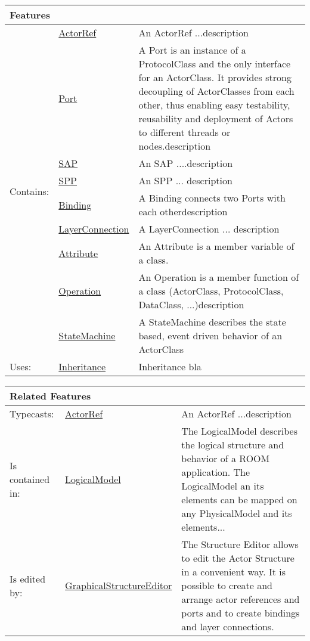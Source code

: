 			
			\begingroup
			\renewcommand{\arraystretch}{1.8} %
			\begin{longtable}{p{2.5cm}|p{4cm} p{}}
				\multicolumn{2}{l}{\textbf{\large Features}} & \\
				\hline
			\multirow{9}{*}{Contains:} & \tabitem \hyperlink{ref:ActorRef}{ActorRef}  & An ActorRef ...description\\
			& \tabitem \hyperlink{ref:Port}{Port}  & A Port is an instance of a ProtocolClass and the only interface for an ActorClass. It provides strong decoupling of ActorClasses from each other, thus enabling easy testability, reusability and deployment of Actors to different threads or nodes.description  \\
			& \tabitem \hyperlink{ref:SAP}{SAP}  & An SAP ....description  \\
			& \tabitem \hyperlink{ref:SPP}{SPP}  & An SPP ... description \\
			& \tabitem \hyperlink{ref:Binding}{Binding}  & A Binding connects two Ports with each otherdescription \\
			& \tabitem \hyperlink{ref:LayerConnection}{LayerConnection}  & A LayerConnection ... description  \\
			& \tabitem \hyperlink{ref:Attribute}{Attribute}  & An Attribute is a member variable of a class.  \\
			& \tabitem \hyperlink{ref:Operation}{Operation}  & An Operation is a member function of a class (ActorClass, ProtocolClass, DataClass, ...)description  \\
			& \tabitem \hyperlink{ref:StateMachine}{StateMachine}  & A StateMachine describes the state based, event driven behavior of an ActorClass \\
			\hline
			Uses: & \tabitem \hyperlink{ref:Inheritance}{Inheritance}  & Inheritance bla\\
			\hline
			\end{longtable}
			\endgroup
			
			\begingroup
			\renewcommand{\arraystretch}{1.8} %
			\begin{longtable}{p{2.5cm}|p{4cm} p{}}
				\multicolumn{2}{l}{\textbf{\large Related Features}} & \\
				\hline
			Typecasts: & \tabitem \hyperlink{ref:ActorRef}{ActorRef}  & An ActorRef ...description\\
			\hline
			Is contained in: & \tabitem \hyperlink{ref:LogicalModel}{LogicalModel}  & The LogicalModel describes the logical structure and behavior of a ROOM application. The LogicalModel an its elements can be mapped on any PhysicalModel and its elements...\\
			\hline
			Is edited by: & \tabitem \hyperlink{ref:GraphicalStructureEditor}{GraphicalStructureEditor}  & The Structure Editor allows to edit the Actor Structure in a convenient way. It is possible to create and arrange actor references and ports and to create bindings and layer connections.\\
			\hline
			\end{longtable}
			\endgroup
			
